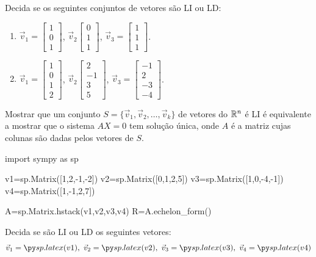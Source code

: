 \begin{frame}[label=lild]{}
\begin{exe}
Decida se os seguintes conjuntos de vetores são LI ou LD:
\begin{enumerate}
\item 
$\vec{v}_1=
\begin{bmatrix}
1 \\ 0 \\1
\end{bmatrix}$, 
$\vec{v}_2\begin{bmatrix}
0\\1\\1
\end{bmatrix}$, $\vec{v}_3=\begin{bmatrix}
1\\1\\1
\end{bmatrix}$.

\item $\vec{v}_1=
\begin{bmatrix}
1 \\ 0 \\1\\2
\end{bmatrix}$, 
$\vec{v}_2\begin{bmatrix}
2 \\ -1 \\ 3 \\ 5
\end{bmatrix}$, $\vec{v}_3=\begin{bmatrix}
-1 \\ 2\\-3\\-4
\end{bmatrix}$.
\end{enumerate}
\end{exe}

\begin{block}{}
Mostrar que um conjunto $S=\{\vec{v}_1,\vec{v}_2,\ldots,\vec{v}_k\}$ de vetores do $\mathbb{R}^n$ é {\color{red}LI} é equivalente a mostrar que o sistema {\color{red}$AX=0$ tem solução única}, onde $A$ é a matriz cujas {\color{red}colunas são dadas pelos vetores de $S$}.
\end{block}

\end{frame}

\begin{frame}[label=lild,fragile]{}
\begin{pycode} 
import sympy as sp

v1=sp.Matrix([1,2,-1,-2])
v2=sp.Matrix([0,1,2,5])
v3=sp.Matrix([1,0,-4,-1])
v4=sp.Matrix([1,-1,2,7])

A=sp.Matrix.hstack(v1,v2,v3,v4)
R=A.echelon_form()
\end{pycode}

\begin{exer}
Decida se são LI ou LD os seguintes vetores:
\[
\vec{v}_1=\pyl{v1},\ \vec{v}_2=\pyl{v2},\ \vec{v}_3=\pyl{v3},\ \vec{v}_4=\pyl{v4}
\]
\end{exer}

\end{frame}



